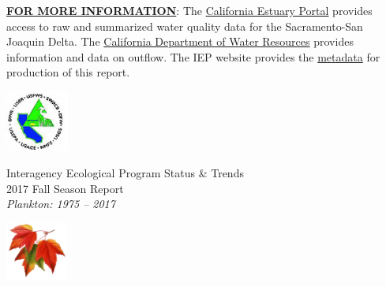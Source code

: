 \documentclass[]{article}\usepackage[]{graphicx}\usepackage[]{color}
\begin{document}
\vspace{0.2cm}

\begin{Row}
    \begin{Cell}{14}
      \textbf{\underline{FOR MORE INFORMATION}}: The 
			\href{https://water.ca.gov/Programs/Environmental-Services/Compliance-Monitoring-And-Assessment/Dayflow-Data}{California Estuary Portal} 
			provides access to raw and summarized water quality data for the 
			Sacramento-San Joaquin Delta. The 
			\href{https://water.ca.gov/Programs/Environmental-Services/Compliance-Monitoring-And-Assessment/Dayflow-Data}{California Department of Water Resources} 
			provides information and data on outflow. The IEP website provides the 
			\href{https://water.ca.gov/-/media/DWR-Website/Web-Pages/Programs/Environmental-Services/Interagency-Ecological-Program/Files/Interagency-Ecological-Program-Status-and-Trends-Fall-2017.pdf}{metadata} 
			for production of this report.
    \end{Cell}
    \begin{Cell}{2}

    \end{Cell}
\end{Row}


\newpage



\begin{Row}
  \begin{Cell}{1}
    \begin{center}
      \includegraphics[align=m,height=2cm]{figures/IEP_logo.PNG}
    \end{center}
  \end{Cell}
  \begin{Cell}{6}
    \begin{center}
      \vspace{-0.8cm}		%
      \doublespacing
      {\Large Interagency Ecological Program Status \& Trends } \\
      \vspace{0.2cm}
      {\Huge 2017 Fall Season Report} \\
      {\Large \emph{Plankton: 1975 -- 2017}}
    \end{center}
  \end{Cell}
  \begin{Cell}{1}
    \begin{center}
      \includegraphics[align=m,height=1.9cm]{figures/fall_logo.PNG}
    \end{center}
  \end{Cell}
  \begin{Cell}{4}
  \end{Cell}
\end{Row}
\end{document}

